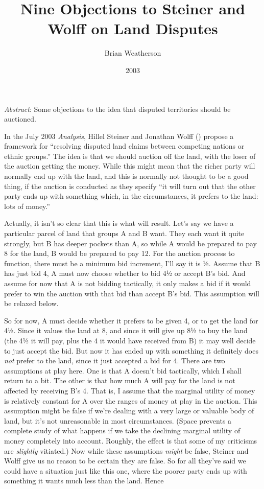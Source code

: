 \documentclass[
  11pt,
  letterpaper,
  DIV=11,
  numbers=noendperiod,
  twoside]{scrartcl}
\title{Nine Objections to Steiner and Wolff on Land Disputes}
\author{Brian Weatherson}
\date{2003}
\renewenvironment{abstract}
 {\vspace{-1.25cm}
 \quotation\small\noindent\emph{Abstract}:}
 {\endquotation}
\renewenvironment{abstract}
 {\quotation\small\noindent\emph{Abstract}:}
 {\endquotation\vspace{-0.02cm}}
\begin{document}
\maketitle
\begin{abstract}
Some objections to the idea that disputed territories should be
auctioned.
\end{abstract}


In the July 2003 \emph{Analysis}, Hillel Steiner and Jonathan Wolff
() propose a framework for ``resolving
disputed land claims between competing nations or ethnic groups.'' The
idea is that we should auction off the land, with the loser of the
auction getting the money. While this might mean that the richer party
will normally end up with the land, and this is normally not thought to
be a good thing, if the auction is conducted as they specify ``it will
turn out that the other party ends up with something which, in the
circumstances, it prefers to the land: lots of money.''

Actually, it isn't so clear that this is what will result. Let's say we
have a particular parcel of land that groups A and B want. They each
want it quite strongly, but B has deeper pockets than A, so while A
would be prepared to pay 8 for the land, B would be prepared to pay 12.
For the auction process to function, there must be a minimum bid
increment, I'll say it is ½. Assume that B has just bid 4, A must now
choose whether to bid 4½ or accept B's bid. And assume for now that A is
not bidding tactically, it only makes a bid if it would prefer to win
the auction with that bid than accept B's bid. This assumption will be
relaxed below.

So for now, A must decide whether it prefers to be given 4, or to get
the land for 4½. Since it values the land at 8, and since it will give
up 8½ to buy the land (the 4½ it will pay, plus the 4 it would have
received from B) it may well decide to just accept the bid. But now it
has ended up with something it definitely does \emph{not} prefer to the
land, since it just accepted a bid for 4. There are two assumptions at
play here. One is that A doesn't bid tactically, which I shall return to
a bit. The other is that how much A will pay for the land is not
affected by receiving B's 4. That is, I assume that the marginal utility
of money is relatively constant for A over the ranges of money at play
in the auction. This assumption might be false if we're dealing with a
very large or valuable body of land, but it's not unreasonable in most
circumstances. (Space prevents a complete study of what happens if we
take the declining marginal utility of money completely into account.
Roughly, the effect is that some of my criticisms are \emph{slightly}
vitiated.) Now while these assumptions \emph{might} be false, Steiner
and Wolff give us no reason to be certain they are false. So for all
they've said we could have a situation just like this one, where the
poorer party ends up with something it wants much less than the land.
Hence
\end{document}
